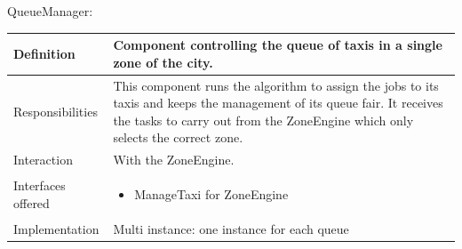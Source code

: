 \documentclass[a4paper,11pt]{report} %
\begin{document}
	\centerline{QueueManager:}
	\begin{center}
		\begin{tabular}{| l | p{9cm} |}\hline
			Definition & Component controlling the queue of taxis in a single zone of the city.\\\hline
			Responsibilities & This component runs the algorithm to assign the jobs to its taxis and keeps the management of its queue fair. It receives the tasks to carry out from the ZoneEngine which only selects the correct zone.\\\hline
			Interaction & With the ZoneEngine.\\\hline
			Interfaces offered & \begin{itemize}
				\item ManageTaxi for ZoneEngine
			\end{itemize}\\\hline
			Implementation & Multi instance: one instance for each queue\\\hline
		\end{tabular}
	\end{center}	
	
	\pagebreak
\end{document}
